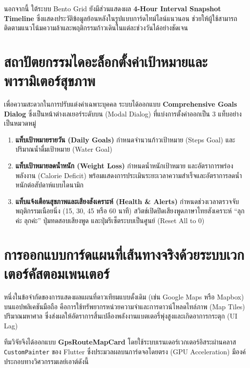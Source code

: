 นอกจากนี้ ใต้ระบบ Bento Grid ยังมีส่วนแสดงผล \textbf{4-Hour Interval Snapshot Timeline} ซึ่งแสดงประวัติข้อมูลย้อนหลังในรูปแบบการ์ดไทม์ไลน์แนวนอน ช่วยให้ผู้ใช้สามารถติดตามแนวโน้มความล้าและพฤติกรรมก้าวเดินในแต่ละช่วงวันได้อย่างชัดเจน

\section{สถาปัตยกรรมไดอะล็อกตั้งค่าเป้าหมายและพารามิเตอร์สุขภาพ}
เพื่อความสะดวกในการปรับแต่งค่าเฉพาะบุคคล ระบบได้ออกแบบ \textbf{Comprehensive Goals Dialog} ซึ่งเป็นหน้าต่างเลเยอร์ระดับบน (Modal Dialog) ที่แบ่งการตั้งค่าออกเป็น 3 แท็บอย่างเป็นหมวดหมู่
\begin{enumerate}
    \item \textbf{แท็บเป้าหมายรายวัน (Daily Goals)} กำหนดจำนวนก้าวเป้าหมาย (Steps Goal) และปริมาณน้ำดื่มเป้าหมาย (Water Goal)
    \item \textbf{แท็บเป้าหมายลดน้ำหนัก (Weight Loss)} กำหนดน้ำหนักเป้าหมาย และอัตราการพร่องพลังงาน (Calorie Deficit) พร้อมแสดงการประเมินระยะเวลาความสำเร็จและอัตราการลดน้ำหนักต่อสัปดาห์แบบไดนามิก
    \item \textbf{แท็บแจ้งเตือนสุขภาพและเสียงสังเคราะห์ (Health \& Alerts)} กำหนดช่วงเวลาตรวจจับพฤติกรรมเนือยนิ่ง (15, 30, 45 หรือ 60 นาที) สวิตช์เปิดปิดเสียงพูดภาษาไทยสังเคราะห์ ``ลุกค่ะ ลุกค่ะ'' ปุ่มทดสอบเสียงพูด และปุ่มรีเซ็ตระบบเป็นศูนย์ (Reset All to 0)
\end{enumerate}

\section{การออกแบบการ์ดแผนที่เส้นทางจริงด้วยระบบเวกเตอร์คัสตอมเพนเตอร์}
หนึ่งในข้อจำกัดของการแสดงผลแผนที่ดาวเทียมแบบดั้งเดิม (เช่น Google Maps หรือ Mapbox) บนแอปพลิเคชันมือถือ คือการใช้ทรัพยากรหน่วยความจำและการดาวน์โหลดไทล์ภาพ (Map Tiles) ปริมาณมหาศาล ซึ่งส่งผลให้อัตราการสิ้นเปลืองพลังงานแบตเตอรี่พุ่งสูงและเกิดอาการกระตุก (UI Lag)

ทีมวิจัยจึงได้ออกแบบ \textbf{GpsRouteMapCard} โดยใช้ระบบเรนเดอร์เวกเตอร์อิสระผ่านคลาส \texttt{CustomPainter} ของ Flutter ซึ่งประมวลผลบนการ์ดจอโดยตรง (GPU Acceleration) มีองค์ประกอบทางวิศวกรรมเลย์เอาต์ดังนี้

